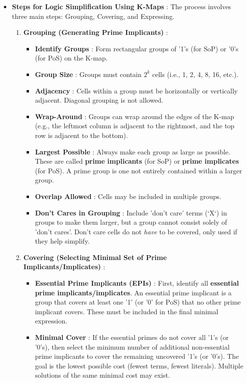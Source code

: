\documentclass{article}
\begin{document}
\begin{itemize}
    \item \textbf{Steps for Logic Simplification Using K-Maps} : The process involves three main steps: Grouping, Covering, and Expressing.
    \begin{enumerate}
        \item \textbf{Grouping (Generating Prime Implicants)} :
        \begin{itemize}
            \item \textbf{Identify Groups} : Form rectangular groups of '1's (for SoP) or '0's (for PoS) on the K-map.
            \item \textbf{Group Size} : Groups must contain $2^k$ cells (i.e., 1, 2, 4, 8, 16, etc.).
            \item \textbf{Adjacency} : Cells within a group must be horizontally or vertically adjacent. Diagonal grouping is not allowed.
            \item \textbf{Wrap-Around} : Groups can wrap around the edges of the K-map (e.g., the leftmost column is adjacent to the rightmost, and the top row is adjacent to the bottom).
            \item \textbf{Largest Possible} : Always make each group as large as possible. These are called \textbf{prime implicants} (for SoP) or \textbf{prime implicates} (for PoS). A prime group is one not entirely contained within a larger group.
            \item \textbf{Overlap Allowed} : Cells may be included in multiple groups.
            \item \textbf{Don't Cares in Grouping} : Include 'don't care' terms (`X`) in groups to make them larger, but a group cannot consist solely of 'don't cares'. Don't care cells do not \textit{have} to be covered, only used if they help simplify.
        \end{itemize}
        \item \textbf{Covering (Selecting Minimal Set of Prime Implicants/Implicates)} :
        \begin{itemize}
            \item \textbf{Essential Prime Implicants (EPIs)} : First, identify all \textbf{essential prime implicants/implicates}. An essential prime implicant is a group that covers at least one '1' (or '0' for PoS) that no other prime implicant covers. These must be included in the final minimal expression.
            \item \textbf{Minimal Cover} : If the essential primes do not cover all '1's (or '0's), then select the minimum number of additional non-essential prime implicants to cover the remaining uncovered '1's (or '0's). The goal is the lowest possible cost (fewest terms, fewest literals). Multiple solutions of the same minimal cost may exist.

\end{itemize}
\end{enumerate}
\end{itemize}
\end{document}
